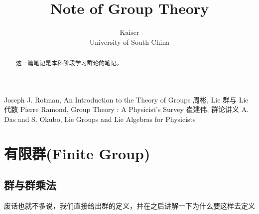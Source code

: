 \documentclass{article}
\title{Note of Group Theory}
\author{Kaiser\\University of South China}
\begin{document}
\maketitle




\begin{abstract}
    \normalsize
    这一篇笔记是本科阶段学习群论的笔记。
\end{abstract}

\begin{center}
    \large
    \begin{thebibliography}{99} 
         Joseph J. Rotman, An Introduction to the Theory of Groups
         周彬, Lie 群与 Lie 代数
         Pierre Ramond, Group Theory : A Physicist's Survey
         崔建伟, 群论讲义
         A. Das and S. Okubo, Lie Groups and Lie Algebras for Physicists
    \end{thebibliography}
\end{center}


\begin{center}
    \tableofcontents
\end{center}

\newpage



\section{有限群(Finite Group)}


\subsection{群与群乘法}

废话也就不多说，我们直接给出群的定义，并在之后讲解一下为什么要这样去定义
\end{document}
